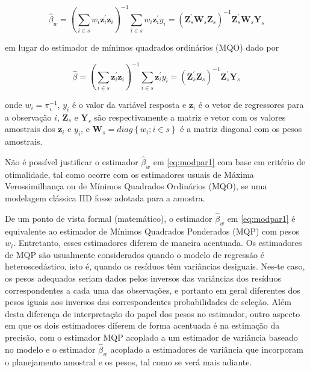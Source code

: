 \documentclass[]{book}
\theoremstyle{definition}
\theoremstyle{definition}
\theoremstyle{definition}
\theoremstyle{remark}
\begin{document}
\begin{equation}
\widehat{\beta }_{w}=\left(\sum_{i\in s}w_{i}\mathbf{z}_{i}^{\prime }
\mathbf{z}_{i}\right) ^{-1}\sum_{i\in s}w_{i}\mathbf{z}_{i}^{\prime}y_{i}=
\left(\mathbf{Z}_{s}^{\prime }\mathbf{W}_{s}\mathbf{Z}_{s}\right)^{-1}\mathbf{Z}_{s}^{\prime }\mathbf{W}_{s}\mathbf{Y}_{s} 
\label{eq:modpar1}
\end{equation}

em lugar do estimador de mínimos quadrados ordinários (MQO) dado por

\begin{equation}
\widehat{\beta}=\left( \sum_{i\in s}\mathbf{z}_{i}^{\prime }\mathbf{z}_{i}\right)^{-1}\sum_{i\in s}\mathbf{z}_{i}^{\prime }y_{i}=\left(\mathbf{Z}_{s}^{\prime }\mathbf{Z}_{s}\right)^{-1}\mathbf{Z}_{s}^{\prime }\mathbf{Y}_{s}  
\label{eq:modpar2}
\end{equation}

onde \(w_{i}=\pi _{i}^{-1}\), \(y_{i}\) é o valor da variável resposta e
\(\mathbf{z}_{i}\) é o vetor de regressores para a observação \(i\),
\(\mathbf{Z}_{s}\) e \(\mathbf{Y}_{s}\) são respectivamente a matriz e
vetor com os valores amostrais dos \(\mathbf{z}_{i}\) e \(y_{i}\), e
\(\mathbf{W}_{s}=diag\left\{ w_{i};i\in s\right\}\) é a matriz diagonal
com os pesos amostrais.

Não é possível justificar o estimador \(\widehat{\beta }_{w}\) em
\eqref{eq:modpar1} com base em critério de otimalidade, tal como ocorre
com os estimadores usuais de Máxima Verossimilhança ou de Mínimos
Quadrados Ordinários (MQO), se uma modelagem clássica IID fosse adotada
para a amostra.

De um ponto de vista formal (matemático), o estimador
\(\widehat{\beta }_{w}\) em \eqref{eq:modpar1} é equivalente ao estimador
de Mínimos Quadrados Ponderados (MQP) com pesos \(w_{i}\). Entretanto,
esses estimadores diferem de maneira acentuada. Os estimadores de MQP
são usualmente considerados quando o modelo de regressão é
heteroscedástico, isto é, quando os resíduos têm variâncias desiguais.
Nes-te caso, os pesos adequados seriam dados pelos inversos das
variâncias dos resíduos correspondentes a cada uma das observações, e
portanto em geral diferentes dos pesos iguais aos inversos das
correspondentes probabilidades de seleção. Além desta diferença de
interpretação do papel dos pesos no estimador, outro aspecto em que os
dois estimadores diferem de forma acentuada é na estimação da precisão,
com o estimador MQP acoplado a um estimador de variância baseado no
modelo e o estimador \(\widehat{\beta }_{w}\) acoplado a estimadores de
variância que incorporam o planejamento amostral e os pesos, tal como se
verá mais adiante.
\end{document}
